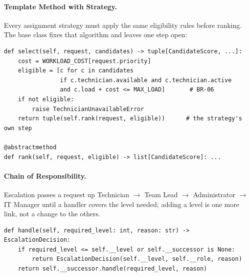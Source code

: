 \paragraph{Template Method with Strategy.} Every assignment strategy must apply the same
eligibility rules before ranking. The base class fixes that algorithm and leaves one step open:
\begin{lstlisting}
def select(self, request, candidates) -> tuple[CandidateScore, ...]:
    cost = WORKLOAD_COST[request.priority]
    eligible = [c for c in candidates
                if c.technician.available and c.technician.active
                and c.load + cost <= MAX_LOAD]       # BR-06
    if not eligible:
        raise TechnicianUnavailableError
    return tuple(self.rank(request, eligible))      # the strategy's own step

@abstractmethod
def rank(self, request, eligible) -> list[CandidateScore]: ...
\end{lstlisting}

\paragraph{Chain of Responsibility.} Escalation passes a request up Technician $\rightarrow$
Team Lead $\rightarrow$ Administrator $\rightarrow$ IT Manager until a handler covers the level
needed; adding a level is one more link, not a change to the others.
\begin{lstlisting}
def handle(self, required_level: int, reason: str) -> EscalationDecision:
    if required_level <= self.__level or self.__successor is None:
        return EscalationDecision(self.__level, self.__role, reason)
    return self.__successor.handle(required_level, reason)
\end{lstlisting}
